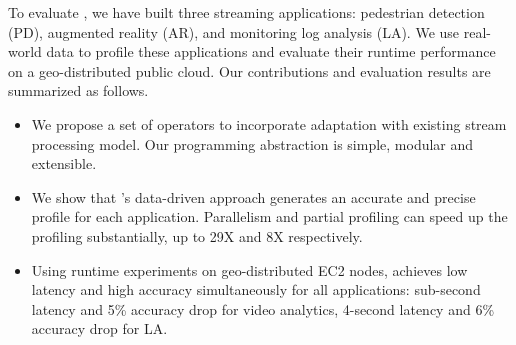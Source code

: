 To evaluate \sysname{}, we have built three streaming applications: pedestrian
detection (PD), augmented reality (AR), and monitoring log analysis (LA). We use
real-world data to profile these applications and evaluate their runtime
performance on a geo-distributed public cloud. Our contributions and
evaluation results are summarized as follows.

\begin{itemize}[leftmargin=16pt]

\item We propose a set of \maybe{} operators to incorporate adaptation with
  existing stream processing model. Our programming abstraction is simple,
  modular and extensible.

\item We show that \sysname{}'s data-driven approach generates an accurate and
  precise profile for each application. Parallelism and partial profiling can
  speed up the profiling substantially, up to 29X and 8X respectively.

\item Using runtime experiments on geo-distributed EC2 nodes, \sysname{}
  achieves low latency and high accuracy simultaneously for all applications:
  sub-second latency and 5\% accuracy drop for video analytics, 4-second latency
  and 6\% accuracy drop for LA.

\end{itemize}


